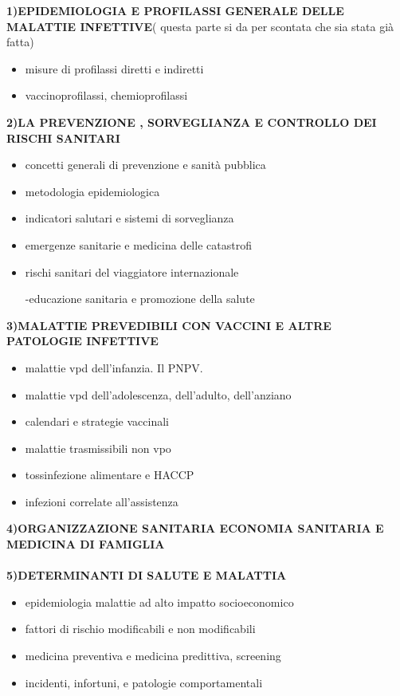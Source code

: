 \textbf{1)EPIDEMIOLOGIA E PROFILASSI GENERALE DELLE MALATTIE INFETTIVE}(
questa parte si da per scontata che sia stata già fatta)
\begin{itemize}

\item misure di profilassi diretti e indiretti

\item vaccinoprofilassi, chemioprofilassi
\end{itemize}
\textbf{2)LA PREVENZIONE , SORVEGLIANZA E CONTROLLO DEI RISCHI SANITARI}
\begin{itemize}

\item concetti generali di prevenzione e sanità pubblica

\item metodologia epidemiologica

\item indicatori salutari e sistemi di sorveglianza

\item emergenze sanitarie e medicina delle catastrofi

\item rischi sanitari del viaggiatore internazionale

-educazione sanitaria e promozione della salute
\end{itemize}
\textbf{3)MALATTIE PREVEDIBILI CON VACCINI E ALTRE PATOLOGIE INFETTIVE}
\begin{itemize}

\item malattie vpd dell'infanzia. Il PNPV.

\item malattie vpd dell'adolescenza, dell'adulto, dell'anziano

\item calendari e strategie vaccinali

\item  malattie trasmissibili non vpo

\item  tossinfezione alimentare e HACCP

\item infezioni correlate all'assistenza
\end{itemize}
\textbf{4)ORGANIZZAZIONE SANITARIA ECONOMIA SANITARIA E MEDICINA DI
FAMIGLIA}
\\\\
\textbf{5)DETERMINANTI DI SALUTE E MALATTIA}
\begin{itemize}

\item epidemiologia malattie ad alto impatto socioeconomico

\item fattori di rischio modificabili e non modificabili

\item medicina preventiva e medicina predittiva, screening

\item incidenti, infortuni, e patologie comportamentali
\end{itemize}
